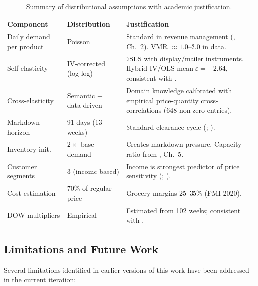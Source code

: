 \documentclass[11pt,a4paper]{article}
\begin{document}
\begin{table}[H]
\centering
\caption{Summary of distributional assumptions with academic justification.}
\begin{tabular}{@{}p{3cm}p{3cm}p{6.5cm}@{}}
\toprule
\textbf{Component} & \textbf{Distribution} & \textbf{Justification} \\
\midrule
Daily demand per product & Poisson & Standard in revenue management (\citealt{talluri2004}, Ch.\ 2). VMR $\approx 1.0$--$2.0$ in data. \\
Self-elasticity & IV-corrected (log-log) & 2SLS with display/mailer instruments. Hybrid IV/OLS mean $\varepsilon = -2.64$, consistent with \citealt{bijmolt2005}. \\
Cross-elasticity & Semantic + data-driven & Domain knowledge calibrated with empirical price-quantity cross-correlations (648 non-zero entries). \\
Markdown horizon & 91 days (13 weeks) & Standard clearance cycle (\citealt{phillips2005}; \citealt{talluri2004}). \\
Inventory init.\ & $2\times$ base demand & Creates markdown pressure. Capacity ratio from \citet{talluri2004}, Ch.\ 5. \\
Customer segments & 3 (income-based) & Income is strongest predictor of price sensitivity (\citealt{hoch1995}; \citealt{blattberg1990}). \\
Cost estimation & 70\% of regular price & Grocery margins 25--35\% (FMI 2020). \\
DOW multipliers & Empirical & Estimated from 102 weeks; consistent with \citet{walters1988}. \\
\bottomrule
\end{tabular}
\end{table}

\subsection{Limitations and Future Work}

Several limitations identified in earlier versions of this work have been addressed in the current iteration:
\end{document}
